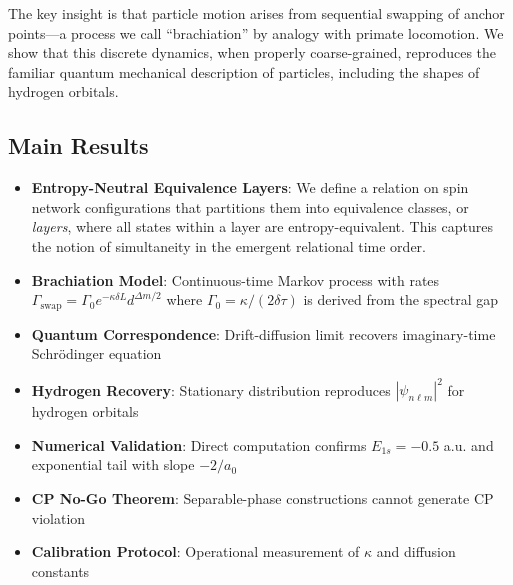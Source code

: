 \documentclass[11pt]{article}
\theoremstyle{plain}
\theoremstyle{definition}
\begin{document}
The key insight is that particle motion arises from sequential swapping of anchor points—a process we call ``brachiation'' by analogy with primate locomotion. We show that this discrete dynamics, when properly coarse-grained, reproduces the familiar quantum mechanical description of particles, including the shapes of hydrogen orbitals.

\subsection{Main Results}

\begin{tcolorbox}[title=Key Results of This Paper]
  \begin{itemize}
    \item \textbf{Entropy-Neutral Equivalence Layers}: We define a relation on spin network configurations that partitions them into equivalence classes, or \emph{layers}, where all states within a layer are entropy-equivalent. This captures the notion of simultaneity in the emergent relational time order.
    \item \textbf{Brachiation Model}: Continuous-time Markov process with rates $\Gamma_{\text{swap}} = \Gamma_0 e^{-\kappa\delta L} d^{\Delta m/2}$ where $\Gamma_0 = \kappa/(2\delta\tau)$ is derived from the spectral gap
    \item \textbf{Quantum Correspondence}: Drift-diffusion limit recovers imaginary-time Schrödinger equation
    \item \textbf{Hydrogen Recovery}: Stationary distribution reproduces $|\psi_{n\ell m}|^2$ for hydrogen orbitals
    \item \textbf{Numerical Validation}: Direct computation confirms $E_{1s} = -0.5$ a.u. and exponential tail with slope $-2/a_0$
    \item \textbf{CP No-Go Theorem}: Separable-phase constructions cannot generate CP violation
    \item \textbf{Calibration Protocol}: Operational measurement of $\kappa$ and diffusion constants
  \end{itemize}
\end{tcolorbox}

\end{document}
